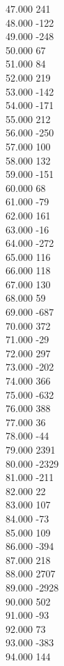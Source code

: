 { 47.000	241 \\
 48.000	-122 \\
 49.000	-248 \\
 50.000	67 \\
 51.000	84 \\
 52.000	219 \\
 53.000	-142 \\
 54.000	-171 \\
 55.000	212 \\
 56.000	-250 \\
 57.000	100 \\
 58.000	132 \\
 59.000	-151 \\
 60.000	68 \\
 61.000	-79 \\
 62.000	161 \\
 63.000	-16 \\
 64.000	-272 \\
 65.000	116 \\
 66.000	118 \\
 67.000	130 \\
 68.000	59 \\
 69.000	-687 \\
 70.000	372 \\
 71.000	-29 \\
 72.000	297 \\
 73.000	-202 \\
 74.000	366 \\
 75.000	-632 \\
 76.000	388 \\
 77.000	36 \\
 78.000	-44 \\
 79.000	2391 \\
 80.000	-2329 \\
 81.000	-211 \\
 82.000	22 \\
 83.000	107 \\
 84.000	-73 \\
 85.000	109 \\
 86.000	-394 \\
 87.000	218 \\
 88.000	2707 \\
 89.000	-2928 \\
 90.000	502 \\
 91.000	-93 \\
 92.000	73 \\
 93.000	-383 \\
 94.000	144 \\
}
